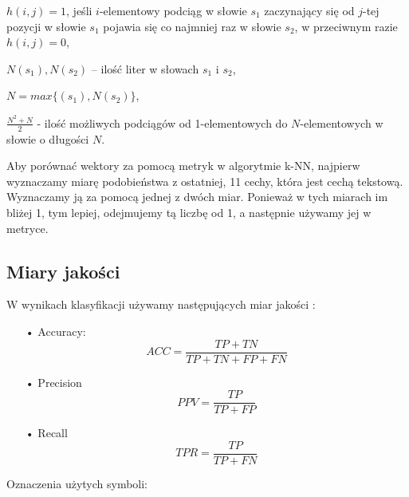 \documentclass{classrep}
\let\bbordermatrix\bordermatrix
\begin{document}
\begin{enumerate}
$h(i,j) = 1$, jeśli $i$-elementowy podciąg w słowie $s_1$ zaczynający się od $j$-tej pozycji w słowie $s_1$ pojawia się co najmniej raz w  słowie $s_2$, w przeciwnym razie $h(i,j) = 0$,

$N(s_1), N(s_2)$ – ilość liter w słowach $s_1$ i $s_2$,

$N = max\{(s_1), N(s_2)\}$,

$\frac{N^2+N}{2}$ - ilość możliwych podciągów od 1-elementowych do $N$-elementowych w słowie o długości $N$.
\end{enumerate}

Aby porównać wektory za pomocą metryk w algorytmie k-NN, najpierw wyznaczamy miarę podobieństwa z ostatniej, 11 cechy, która jest cechą tekstową. Wyznaczamy ją za pomocą jednej z dwóch miar. Ponieważ w tych miarach im bliżej 1, tym lepiej, odejmujemy tą liczbę od 1, a następnie używamy jej w metryce.

\subsection{Miary jakości}
W wynikach klasyfikacji używamy następujących miar jakości \cite{apr}:
\begin{itemize}
\item[•] Accuracy:
\begin{equation}
ACC = \frac{TP + TN}{TP + TN + FP + FN}
\end{equation}
\item[•] Precision
\begin{equation}
PPV = \frac{TP}{TP + FP}
\end{equation}
\item[•] Recall
\begin{equation}
TPR = \frac{TP}{TP + FN}
\end{equation}
\end{itemize}
Oznaczenia użytych symboli:
\end{document}
